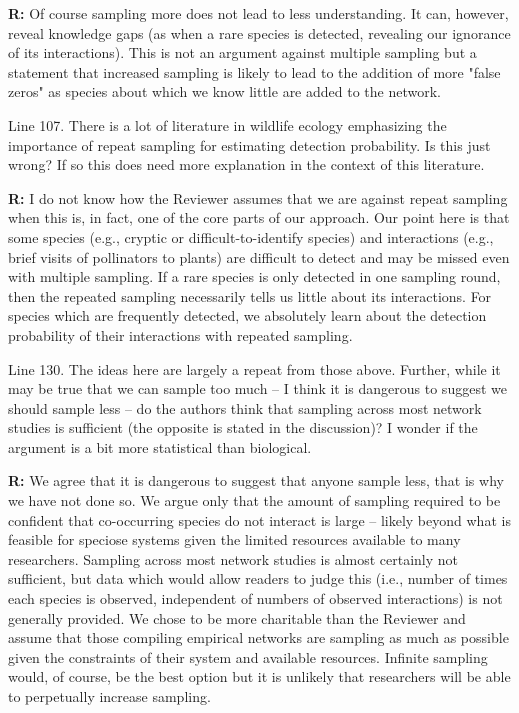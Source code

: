 \documentclass[12pt]{letter}
\newenvironment{refquote}{\bigskip \begin{it}}{\end{it}\smallskip}
\begin{document}
\begin{itemize}
		\textbf{R:} Of course sampling more does not lead to less understanding. It can, however, reveal knowledge gaps (as when a rare species is detected, revealing our ignorance of its interactions). This is not an argument against multiple sampling but a statement that increased sampling is likely to lead to the addition of more "false zeros" as species about which we know little are added to the network.

		\begin{refquote}
		Line 107.  There is a lot of literature in wildlife ecology emphasizing the importance of repeat sampling for estimating detection probability.  Is this just wrong?  If so this does need more explanation in the context of this literature.
		\end{refquote}

		\textbf{R:} I do not know how the Reviewer assumes that we are against repeat sampling when this is, in fact, one of the core parts of our approach. Our point here is that some species (e.g., cryptic or difficult-to-identify species) and interactions (e.g., brief visits of pollinators to plants) are difficult to detect and may be missed even with multiple sampling. If a rare species is only detected in one sampling round, then the repeated sampling necessarily tells us little about its interactions. For species which are frequently detected, we absolutely learn about the detection probability of their interactions with repeated sampling.

		\begin{refquote}
		Line 130.  The ideas here are largely a repeat from those above.  Further, while it may be true that we can sample too much – I think it is dangerous to suggest we should sample less – do the authors think that sampling across most network studies is sufficient (the opposite is stated in the discussion)?  I wonder if the argument is a bit more statistical than biological.
		\end{refquote}

		\textbf{R:} We agree that it is dangerous to suggest that anyone sample less, that is why we have not done so. We argue only that the amount of sampling required to be confident that co-occurring species do not interact is large -- likely beyond what is feasible for speciose systems given the limited resources available to many researchers. Sampling across most network studies is almost certainly not sufficient, but data which would allow readers to judge this (i.e., number of times each species is observed, independent of numbers of observed interactions) is not generally provided. We chose to be more charitable than the Reviewer and assume that those compiling empirical networks are sampling as much as possible given the constraints of their system and available resources. Infinite sampling would, of course, be the best option but it is unlikely that researchers will be able to perpetually increase sampling.


\end{itemize}
\end{document}
